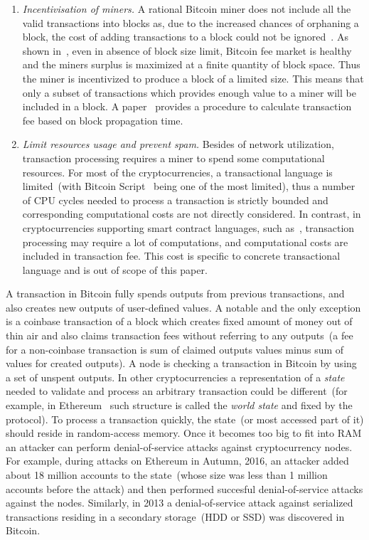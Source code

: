 \documentclass[]{llncs}   %
\begin{document}
\begin{enumerate}
  \item{\em Incentivisation of miners.} A rational Bitcoin miner does not include all the valid transactions into blocks as, due to the increased chances of orphaning a block, the cost of adding transactions to a block could not be ignored~\cite{andersen2013,rizun2015transaction}. As shown in~\cite{rizun2015transaction}, even in absence of block size limit, Bitcoin fee market is healthy and the miners surplus is maximized at a finite quantity of block space. Thus the miner is incentivized to produce a block of a limited size. This means that only a subset of transactions which provides enough value to a miner will be included in a block. A paper~\cite{rizun2015transaction} provides a procedure to calculate transaction fee based on block propagation time.

  \item{\em Limit resources usage and prevent spam. } Besides of network utilization, transaction processing requires a miner to spend some computational resources. For most of the cryptocurrencies, a transactional language is limited~(with Bitcoin Script~\cite{script} being one of the most limited), thus a number of CPU cycles needed to process a transaction is strictly bounded and corresponding computational costs are not directly considered. In contrast, in cryptocurrencies supporting smart contract languages, such as~\cite{seijas2016scripting,tezosScript,solidity}, transaction processing may require a lot of computations, and computational costs are included in transaction fee. This cost is specific to concrete transactional language and is out of scope of this paper.
\end{enumerate}

A transaction in Bitcoin fully spends outputs from previous transactions, and also creates new outputs of user-defined values. A notable and the only exception is a coinbase transaction of a block which creates fixed amount of money out of thin air and also claims transaction fees without referring to any outputs~(a fee for a non-coinbase transaction is sum of claimed outputs values minus sum of values for created outputs). A node is checking a transaction in Bitcoin by using a set of unspent outputs. In other cryptocurrencies a representation of a {\em state} needed to validate and process an arbitrary transaction could be different~(for example, in Ethereum~\cite{ethyp} such structure is called the \textit{world state} and fixed by the protocol). To process a transaction quickly, the state~(or most accessed part of it) should reside in random-access memory. Once it becomes too big to fit into RAM an attacker can perform denial-of-service attacks against cryptocurrency nodes. For example, during attacks on Ethereum in Autumn, 2016, an attacker added about 18 million accounts to the state~(whose size was less than 1 million accounts before the attack) and then performed succesful denial-of-service attacks against the nodes\cite{eth2016dos}. Similarly, in 2013 a denial-of-service attack against serialized transactions residing in a secondary storage~(HDD or SSD) was discovered in Bitcoin\cite{vasek2014empirical}.
\end{document}
